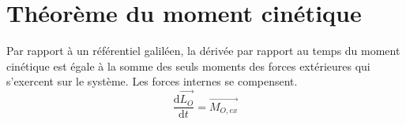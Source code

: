 \documentclass[french]{yLectureNote}
\renewcommand{\vec}{\overrightarrow}
\newcommand{\dd}{\mathrm{d}}
\begin{document}
\section{Théorème du moment cinétique}
\begin{theorem}
Par rapport à un référentiel galiléen, la dérivée par rapport au temps du moment cinétique est égale à la somme des seuls moments des forces extérieures qui s'exercent sur le système. Les forces internes se compensent.
 \[\frac{\dd \vec{L_O}}{\dd t} = \vec{M_{O,ex}}\]
\end{theorem}

\end{document}
